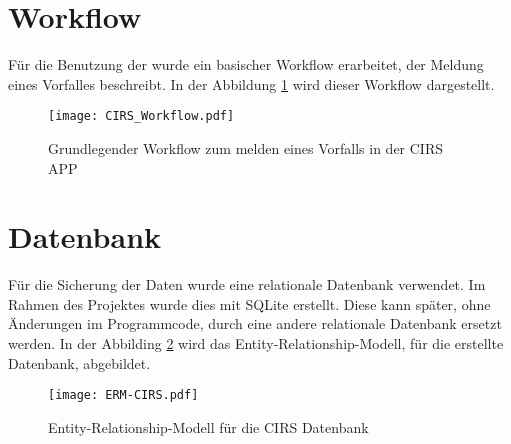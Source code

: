 \section{Workflow}
\label{workflow}
Für die Benutzung der wurde ein basischer Workflow erarbeitet, der Meldung eines Vorfalles beschreibt. In der Abbildung \ref{fig:work} wird dieser Workflow dargestellt.
\begin{figure}[hbt!]
\texttt{[image: CIRS\_Workflow.pdf]}
\caption{Grundlegender Workflow zum melden eines Vorfalls in der CIRS APP}
\label{fig:work}
\end{figure}

\section{Datenbank}
\label{datenbank}
Für die Sicherung der Daten wurde eine relationale Datenbank verwendet. Im Rahmen des Projektes wurde dies mit SQLite erstellt. Diese kann später, ohne Änderungen im Programmcode, durch eine andere relationale Datenbank ersetzt werden. In der Abbilding \ref{fig:cirs_data} wird das Entity-Relationship-Modell, für die erstellte Datenbank, abgebildet.
\begin{figure}[hbt!]
\texttt{[image: ERM-CIRS.pdf]}
\caption{Entity-Relationship-Modell für die CIRS Datenbank}
\label{fig:cirs_data}
\end{figure}